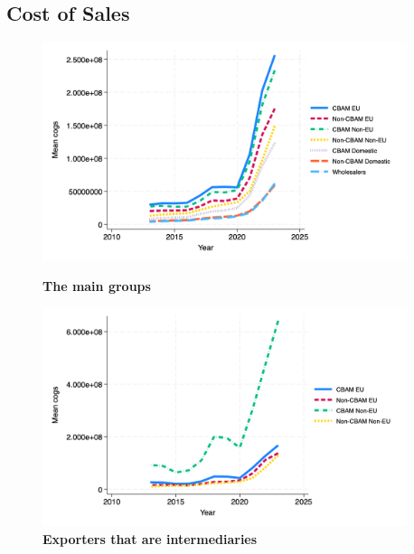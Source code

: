 \documentclass{article}
\begin{document}
\subsection{Cost of Sales}
\begin{figure}[H]
\centering
\includegraphics[width=0.95\textwidth]{cogs_main_groups.png}
\caption{\textbf{The main groups}}
\includegraphics[width=0.95\textwidth]{cogs_ei.png}
\caption{\textbf{Exporters that are intermediaries}}
\end{figure}
\end{document}
